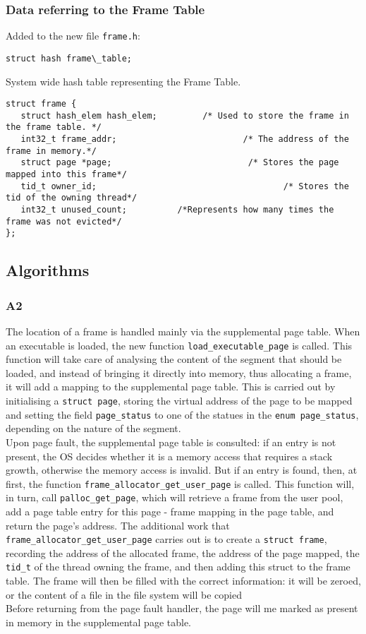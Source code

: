 \documentclass[a4wide, 11pt]{article}
\newcommand{\tx}{\texttt}
\begin{document}
\subsubsection{Data referring to the Frame Table}

Added to the new file \tx{frame.h}:
\begin{verbatim}
struct hash frame\_table;
\end{verbatim}
System wide hash table representing the Frame Table.

\begin{verbatim}
struct frame {
   struct hash_elem hash_elem;		   /* Used to store the frame in the frame table. */
   int32_t frame_addr;				           /* The address of the frame in memory.*/
   struct page *page;				            /* Stores the page mapped into this frame*/
   tid_t owner_id;						               /* Stores the tid of the owning thread*/
   int32_t unused_count;          /*Represents how many times the frame was not evicted*/
};
\end{verbatim}



\subsection{Algorithms}
\subsubsection{A2}
The location of a frame is handled mainly via the supplemental page table.
When an executable is loaded, the new function \tx{load\_executable\_page} is called. This function will take care of analysing the content of the segment that should be loaded, and instead of bringing it directly into memory, thus allocating a frame, it will add a mapping to the supplemental page table. This is carried out by initialising a \tx{struct page}, storing the virtual address of the page to be mapped and   setting the field \tx{page\_status} to one of the statues in the \tx{enum page\_status}, depending on the nature of the segment. \\
Upon page fault, the supplemental page table is consulted: if an entry is not present, the OS decides whether it is a memory access that requires a stack growth, otherwise the memory access is invalid. But if an entry is found, then, at first, the function \tx{frame\_allocator\_get\_user\_page} is called. This function will, in turn, call \tx{palloc\_get\_page}, which will retrieve a frame from the user pool, add a page table entry for this page - frame mapping in the page table, and return the page's address. The additional work that \tx{frame\_allocator\_get\_user\_page} carries out is to create a \tx{struct frame}, recording the address of the allocated frame, the address of the page  mapped, the \tx{tid\_t} of the thread owning the frame, and then adding this struct to the frame table. The frame will then be filled with the correct information: it will be zeroed, or the content of a file in the file system will be copied \\
Before returning from the page fault handler, the page will me marked as present in memory in the supplemental page table.
\end{document}
